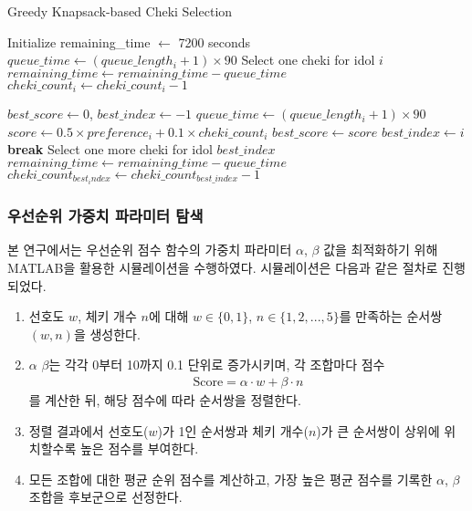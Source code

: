 \documentclass[12pt,hidelinks]{article}
\begin{document}
\begin{algorithm}
\caption{Greedy Knapsack-based Cheki Selection}
\label{alg:knapsack}
\begin{algorithmic}[1]
\STATE Initialize remaining\_time $\gets$ 7200 seconds
		\STATE $queue\_time \gets (queue\_length_i +1) \times 90$
			\STATE Select one cheki for idol $i$
			\STATE $remaining\_time \gets remaining\_time - queue\_time$
			\STATE $cheki\_count_i \gets cheki\_count_i - 1$
		\ENDIF
	\ENDIF
\ENDFOR

	\STATE $best\_score \gets 0$, $best\_index \gets -1$
		\STATE $queue\_time \gets (queue\_length_i +1) \times 90$
			\STATE $score \gets 0.5 \times preference_i + 0.1 \times cheki\_count_i$
				\STATE $best\_score \gets score$
				\STATE $best\_index \gets i$
			\ENDIF
		\ENDIF
	\ENDFOR
		\STATE \textbf{break}
	\ENDIF
	\STATE Select one more cheki for idol $best\_index$
	\STATE $remaining\_time \gets remaining\_time - queue\_time$
	\STATE $cheki\_count_{best_index} \gets cheki\_count_{best\_index} -1$
\ENDWHILE
\end{algorithmic}
\end{algorithm}

\subsubsection{우선순위 가중치 파라미터 탐색}
본 연구에서는 우선순위 점수 함수의 가중치 파라미터 $\alpha$, $\beta$ 값을 최적화하기 위해 MATLAB을 활용한 시뮬레이션을 수행하였다. 시뮬레이션은 다음과 같은 절차로 진행되었다.

\begin{enumerate}
	\item 선호도 $w$, 체키 개수 $n$에 대해 $w \in \{0, 1\}$, $n \in \{1, 2, ..., 5\}$를 만족하는 순서쌍 $(w, n)$을 생성한다.
	\item $\alpha$ $\beta$는 각각 0부터 10까지 0.1 단위로 증가시키며, 각 조합마다 점수
	\begin{multline*}
	\text{Score} = \alpha \cdot w + \beta \cdot n
	\end{multline*}
	를 계산한 뒤, 해당 점수에 따라 순서쌍을 정렬한다.
	\item 정렬 결과에서 선호도($w$)가 1인 순서쌍과 체키 개수($n$)가 큰 순서쌍이 상위에 위치할수록 높은 점수를 부여한다.
	\item 모든 조합에 대한 평균 순위 점수를 계산하고, 가장 높은 평균 점수를 기록한 $\alpha$, $\beta$ 조합을 후보군으로 선정한다.
\end{enumerate}
\end{document}
